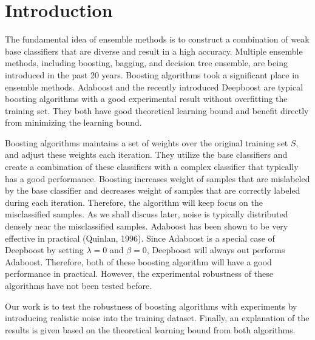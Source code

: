 \section{Introduction}
The fundamental idea of ensemble methods is to construct a combination of weak base classifiers that are diverse and result in a high accuracy.
Multiple ensemble methods, including boosting\cite{}, bagging\cite{}, and decision tree ensemble\cite{}, are being introduced in the past 20 years.
Boosting algorithms took a significant place in ensemble methods. Adaboost\cite{freund1997decision} and the recently introduced Deepboost\cite{cortes2014deep}
are typical boosting algorithms with a good experimental result without overfitting the training set. They both have good theoretical learning bound
and benefit directly from minimizing the learning bound.

Boosting algorithms maintains a set of weights over the original training set $S$, and adjust these weights each iteration.
They utilize the base classifiers and create a combination of these classifiers with a complex classifier that typically has a good performance.
Boosting increases weight of samples that are mislabeled by the base classifier and decreases weight of samples that are correctly labeled during each iteration.
Therefore, the algorithm will keep focus on the misclassified samples.
As we shall discuss later, noise is typically distributed densely near the misclassified samples.
Adaboost has been shown to be very effective in practical (Quinlan, 1996).
Since Adaboost is a special case of Deepboost by setting $\lambda=0$ and $\beta=0$, Deepboost will always out performs Adaboost.
Therefore, both of these boosting algorithm will have a good performance in practical.
However, the experimental robustness of these algorithms have not been tested before.

Our work is to test the robustness of boosting algorithms with experiments by introducing realistic noise into the training dataset.
Finally, an explanation of the results is given based on the theoretical learning bound from both algorithms.
